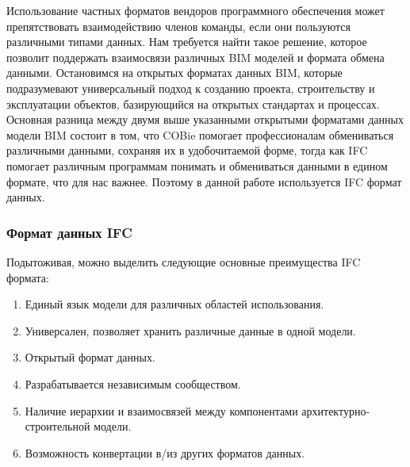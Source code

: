\documentclass[a4paper,14pt]{extreport} %
\begin{document}
Использование частных форматов вендоров программного обеспечения может препятствовать взаимодействию членов команды, если они пользуются различными типами данных. Нам требуется найти такое решение, которое позволит поддержать взаимосвязи различных BIM моделей и формата обмена данными. Остановимся на открытых форматах данных BIM, которые подразумевают универсальный подход к созданию проекта, строительству и эксплуатации объектов, базирующийся на открытых стандартах и процессах. \\
Основная разница между двумя выше указанными открытыми форматами данных модели BIM состоит в том, что COBie помогает профессионалам обмениваться различными данными, сохраняя их в удобочитаемой форме, тогда как IFC помогает различным программам понимать и обмениваться данными в едином формате, что для нас важнее. Поэтому в данной работе используется IFC формат данных. \\

\subsubsection{Формат данных IFC}
Подытоживая, можно выделить следующие основные преимущества IFC формата:
\begin{enumerate}
\item Единый язык модели для различных областей использования.
\item Универсален, позволяет хранить различные данные в одной модели.
\item Открытый формат данных.
\item Разрабатывается независимым сообществом.
\item Наличие иерархии и взаимосвязей между компонентами архитектурно-строительной модели.
\item Возможность конвертации в/из других форматов данных.
\end{enumerate} 
\end{document}
